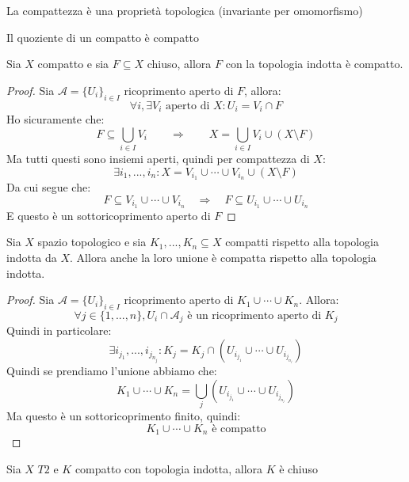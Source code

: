 \documentclass[11pt,a4paper,twoside]{article}
\theoremstyle{definition}
\begin{document}
\begin{cor}{}{}
	La compattezza è una proprietà topologica (invariante per omomorfismo)
\end{cor}

\begin{cor}{}{}
	Il quoziente di un compatto è compatto
\end{cor}

\begin{prop}{}{}
	Sia $X$ compatto e sia $F \subseteq X$ chiuso, allora $F$ con la topologia indotta è compatto.
\end{prop}

\begin{proof}
	Sia $\mathcal A = \{U_i\}_{i \in I}$ ricoprimento aperto di $F$, allora:
	\[ \forall i,\exists V_i \text{ aperto di }X : U_i = V_i \cap F \]
	Ho sicuramente che:
	\[ F \subseteq \bigcup_{i \in I}V_i \qquad \Rightarrow \qquad X = \bigcup_{i \in I}V_i \cup (X \setminus F) \]
	Ma tutti questi sono insiemi aperti, quindi per compattezza di $X$:
	\[\exists i_1,...,i_n : X = V_{i_1}\cup \cdots \cup V_{i_n} \cup (X\setminus F)\]
	Da cui segue che:
	\[ F \subseteq V_{i_1}\cup \cdots \cup V_{i_n} \quad \Rightarrow \quad F \subseteq U_{i_1}\cup \cdots \cup U_{i_n} \]
	E questo è un sottoricoprimento aperto di $F$
\end{proof}

\begin{prop}{}{}
	Sia $X$ spazio topologico e sia $K_1,...,K_n\subseteq X$ compatti rispetto alla topologia indotta da $X$. Allora anche la loro unione è compatta rispetto alla topologia indotta.
\end{prop}

\begin{proof}
	Sia $\mathcal A = \{U_i\}_{i \in I}$ ricoprimento aperto di $K_1\cup \cdots \cup K_n$. Allora:
	\[ \forall j \in \{1,...,n\}, U_i \cap \mathcal A_j \text{ è un ricoprimento aperto di }K_j\]
	Quindi in particolare:
	\[ \exists i_{j_1},...,i_{j_{n_j}}: K_j = K_j \cap (U_{i_{j_{1}}} \cup \cdots \cup U_{i_{j_{n_j}}}) \]
	Quindi se prendiamo l'unione abbiamo che:
	\[ K_1\cup \cdots \cup K_n = \bigcup_j \left(U_{i_{j_1}} \cup \cdots \cup U_{i_{j_{n_j}}}\right)\]
	Ma questo è un sottoricoprimento finito, quindi:
	\[ K_1 \cup \cdots \cup K_n \text{ è compatto} \]
\end{proof}

\begin{prop}{}{}
	Sia $X$ $T2$ e $K$ compatto con topologia indotta, allora $K$ è chiuso
\end{prop}
\end{document}
